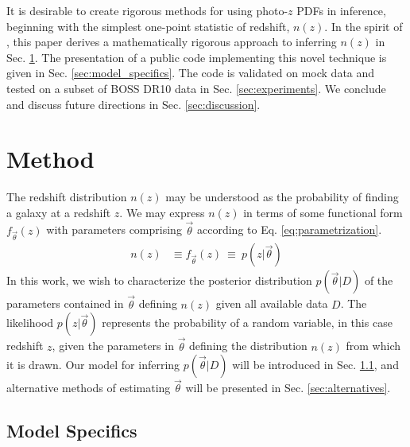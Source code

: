 \documentclass[preprint]{aastex}
\begin{document}
It is desirable to create rigorous methods for using photo-$z$ PDFs in inference, beginning with the simplest one-point statistic of redshift, $n(z)$.  In the spirit of \citet{hogg_inferring_2010, foreman-mackey_exoplanet_2014}, this paper derives a mathematically rigorous approach to inferring $n(z)$ in Sec. \ref{sec:method}.  The presentation of a public code implementing this novel technique is given in Sec. \ref{sec:model_specifics}.  The code is validated on mock data and tested on a subset of BOSS DR10 data in Sec. \ref{sec:experiments}.  We conclude and discuss future directions in Sec. \ref{sec:discussion}.

\section{Method}
\label{sec:method}

The redshift distribution $n(z)$ may be understood as the probability of finding a galaxy at a redshift $z$.  We may express $n(z)$ in terms of some functional form $f_{\vec{\theta}}(z)$ with parameters comprising $\vec{\theta}$ according to Eq. \ref{eq:parametrization}.  
\begin{align}
\label{eq:parametrization}
n(z) &\equiv f_{\vec{\theta}}(z)\ \equiv\ p(z|\vec{\theta})
\end{align}
In this work, we wish to characterize the posterior distribution $p(\vec{\theta}|D)$ of the parameters contained in $\vec{\theta}$ defining $n(z)$ given all available data $D$.  The likelihood $p(z|\vec{\theta})$ represents the probability of a random variable, in this case redshift $z$, given the parameters in $\vec{\theta}$ defining the distribution $n(z)$ from which it is drawn.  Our model for inferring $p(\vec{\theta}|D)$ will be introduced in Sec. \ref{sec:derivation}, and alternative methods of estimating $\vec{\theta}$ will be presented in Sec. \ref{sec:alternatives}.

\subsection{Model Specifics}
\label{sec:derivation}
\end{document}
